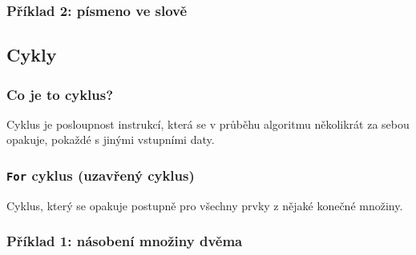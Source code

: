 \documentclass[aspectratio=169,11pt,handout]{beamer}
\begin{document}
\begin{frame}
 \frametitle{Příklad 2: písmeno ve slově}
 \centering
 \begin{minipage}{.9\textwidth}
  \begin{algorithm}[H]
   \DontPrintSemicolon

   \BlankLine
  \end{algorithm}
 \end{minipage}
\end{frame}

\subsection[Cykly]{Cykly}

\begin{frame}
 \frametitle{Co je to cyklus?}
 \begin{tcolorbox}[title=Cyklus,center,width=.9\textwidth]
  Cyklus je posloupnost instrukcí, která se v průběhu algoritmu
  \alert{několikrát za sebou opakuje}, pokaždé s jinými vstupními daty.
 \end{tcolorbox}
\end{frame}

\begin{frame}
 \frametitle{\texttt{For} cyklus (uzavřený cyklus)}
 \begin{tcolorbox}[title=\texttt{For} cyklus,center,width=.9\textwidth]
  Cyklus, který se opakuje postupně pro \alert{všechny prvky z nějaké konečné
  množiny}.
 \end{tcolorbox}
\end{frame}

\begin{frame}
 \frametitle{Příklad 1: násobení množiny dvěma}
 \centering
\end{frame}
\end{document}
